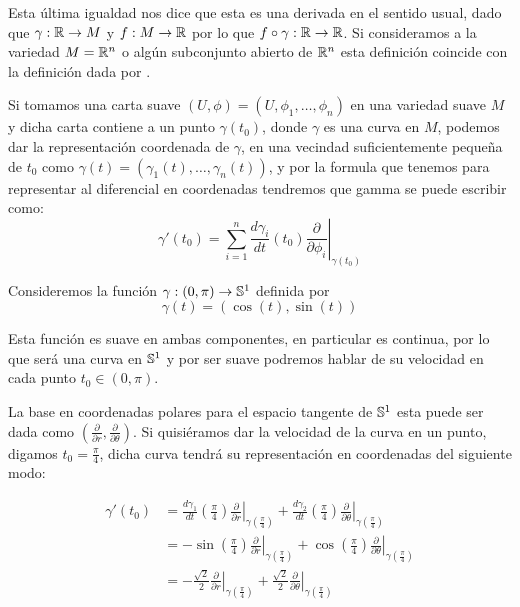Esta última igualdad nos dice que esta es una derivada en el sentido usual, dado que $\gamma: \R \to M$ y $f: M \to \R$ por lo que $f \circ \gamma: \R \to \R$. Si consideramos a la variedad $M=\R^n$ o algún subconjunto abierto de $\R^n$ esta definición coincide con la definición dada por \textcite{do2016differential}.

Si tomamos una carta suave $(U,\phi) = (U,\phi_1,\dots,\phi_n)$ en una variedad suave $M$ y dicha carta contiene a un punto $\gamma(t_0)$, donde $\gamma$ es una curva en $M$, podemos dar la representación coordenada de $\gamma$, en una vecindad suficientemente pequeña de $t_0$ como $\gamma(t) = (\gamma_1(t), \dots, \gamma_n(t))$, y por la formula que tenemos para representar al diferencial en coordenadas tendremos que gamma se puede escribir como:
\[
	\gamma'(t_0)=\sum_{i=1}^{n}\frac{d \gamma_i}{dt} (t_0)
	\left. \frac{\partial}{\partial \phi_i} \right|_{\gamma(t_0)}
\]

\begin{example}
	Consideremos la función $\gamma: (0,\pi) \to \S^{1}$ definida por
	\[
		\gamma(t) = (\cos (t), \sin (t))
	\]

	Esta función es suave en ambas componentes, en particular es continua, por lo que será una curva en $\S^1$ y por ser suave podremos hablar de su velocidad en cada punto $t_0 \in (0,\pi)$.

	La base en coordenadas polares para el espacio tangente de $\S^{1}$ esta puede ser dada como $\left( \frac{\partial}{\partial r} , \frac{\partial}{\partial \theta} \right)$. Si quisiéramos dar la velocidad de la curva en un punto, digamos $t_0 = \frac{\pi}{4}$, dicha curva tendrá su representación en coordenadas del siguiente modo:

	\begin{align*}
		\gamma'(t_0) & = \frac{d \gamma_1}{dt}\left( \frac{\pi}{4} \right)
		\left.\frac{\partial}{\partial r} \right|_{\gamma(\frac{\pi}{4})} +
		\frac{d \gamma_2}{dt} \left(\frac{\pi}{4} \right)
		\left.\frac{\partial}{\partial\theta} \right|_{\gamma(\frac{\pi}{4})} \\
		             & = -\sin \left(\frac{\pi}{4}\right)
		\left. \frac{\partial}{\partial r} \right|_{\gamma(\frac{\pi}{4})} +
		\cos \left( \frac{\pi}{4} \right)
		\left.\frac{\partial}{\partial\theta}\right|_{\gamma(\frac{\pi}{4})}  \\
		             & = -\frac{\sqrt{2}}{2}
		\left. \frac{\partial}{\partial r} \right|_{\gamma(\frac{\pi}{4})}
		+ \frac{\sqrt{2}}{2}
		\left. \frac{\partial}{\partial\theta} \right|_{\gamma(\frac{\pi}{4})}
	\end{align*}
\end{example}

